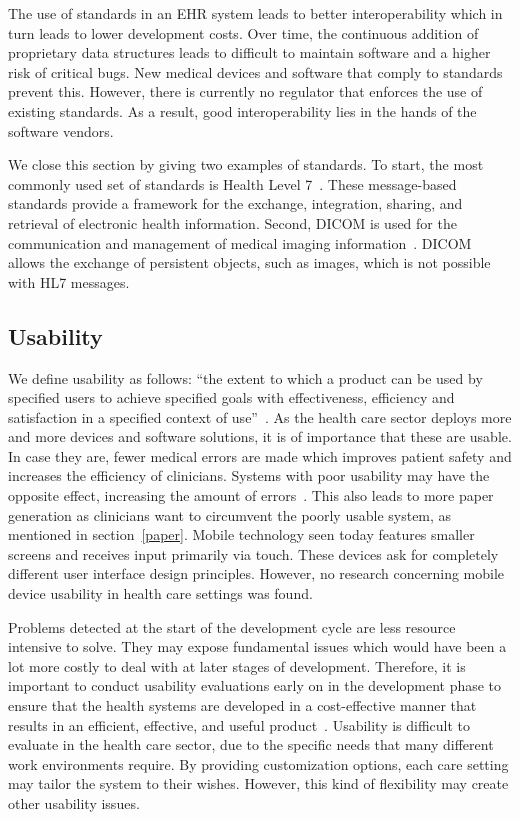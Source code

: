         The use of standards in an EHR system leads to better interoperability which in turn leads to lower development costs. Over time, the continuous addition of proprietary data structures leads to difficult to maintain software and a higher risk of critical bugs. New medical devices and software that comply to standards prevent this. However, there is currently no regulator that enforces the use of existing standards. As a result, good interoperability lies in the hands of the software vendors.

        We close this section by giving two examples of standards. To start, the most commonly used set of standards is Health Level 7~\cite{HL7}. These message-based standards provide a framework for the exchange, integration, sharing, and retrieval of electronic health information. Second, DICOM is used for the communication and management of medical imaging information~\cite{Mildenberger2002}. DICOM allows the exchange of persistent objects, such as images, which is not possible with HL7 messages.

    \subsection{Usability}\label{usability}

    We define usability as follows: ``the extent to which a product can be used by specified users to achieve specified goals with effectiveness, efficiency and satisfaction in a specified context of use''~\cite{Bevan2001}. As the health care sector deploys more and more devices and software solutions, it is of importance that these are usable. In case they are, fewer medical errors are made which improves patient safety and increases the efficiency of clinicians. Systems with poor usability may have the opposite effect, increasing the amount of errors~\cite{Koppel2005}. This also leads to more paper generation as clinicians want to circumvent the poorly usable system, as mentioned in section~\ref{paper}. Mobile technology seen today features smaller screens and receives input primarily via touch. These devices ask for completely different user interface design principles. However, no research concerning mobile device usability in health care settings was found.

    Problems detected at the start of the development cycle are less resource intensive to solve. They may expose fundamental issues which would have been a lot more costly to deal with at later stages of development. Therefore, it is important to conduct usability evaluations early on in the development phase to ensure that the health systems are developed in a cost-effective manner that results in an efficient, effective, and useful product~\cite{Edwards2008}. Usability is difficult to evaluate in the health care sector, due to the specific needs that many different work environments require. By providing customization options, each care setting may tailor the system to their wishes. However, this kind of flexibility may create other usability issues.

